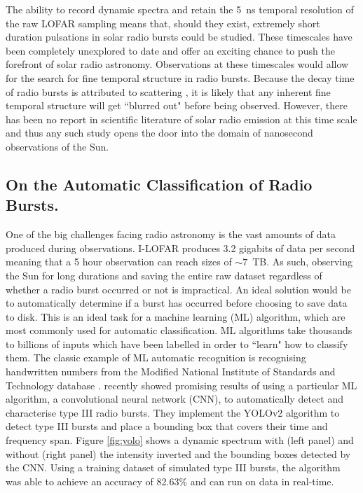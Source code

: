 The ability to record dynamic spectra and retain the 5~ns temporal resolution of the raw LOFAR sampling means that, should they exist, extremely short duration pulsations in solar radio bursts could be studied. These timescales have been completely unexplored to date and offer an exciting chance to push the forefront of solar radio astronomy. Observations at these timescales would allow for the search for fine temporal structure in radio bursts. Because the decay time of radio bursts is attributed to scattering \citep{Krupar2020}, it is likely that any inherent fine temporal structure will get ``blurred out" before being observed. However, there has been no report in scientific literature of solar radio emission at this time scale and thus any such study opens the door into the domain of nanosecond observations of the Sun.

\subsection{On the Automatic Classification of Radio Bursts.}
One of the big challenges facing radio astronomy is the vast amounts of data produced during observations. I-LOFAR produces 3.2 gigabits of data per second meaning that a 5 hour observation can reach sizes of $\sim 7$~TB. As such, observing the Sun for long durations and saving the entire raw dataset regardless of whether a radio burst occurred or not is impractical. An ideal solution would be to automatically determine if a burst has occurred before choosing to save data to disk. 
This is an ideal task for a machine learning (ML) algorithm, which are most commonly used for automatic classification. ML algorithms take thousands to billions of inputs which have been labelled in order to ``learn" how to classify them. The classic example of ML automatic recognition is recognising handwritten numbers from the Modified National Institute of Standards and Technology database \citep[MNIST;][]{LeCun1998}.
\cite{Scully2021} recently showed promising results of using a particular ML algorithm, a convolutional neural network (CNN), to automatically detect and characterise type III radio bursts. They implement the YOLOv2 \citep[You Only Look Once;][]{Yolo9000} algorithm to detect type III bursts and place a bounding box that covers their time and frequency span. Figure \ref{fig:yolo} shows a dynamic spectrum with (left panel) and without (right panel) the intensity inverted and the bounding boxes detected by the CNN. Using a training dataset of simulated type III bursts, the algorithm was able to achieve an accuracy of 82.63$\%$ and can run on data in real-time.  

